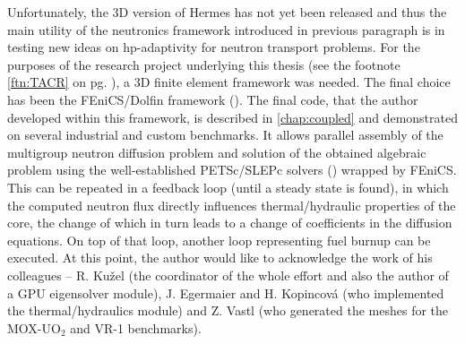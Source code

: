 Unfortunately, the 3D version of Hermes has not yet been released and thus the main utility of the neutronics framework
introduced in previous paragraph is in testing new ideas on hp-adaptivity for neutron transport problems. For the
purposes of the research project underlying this thesis (see the footnote \ref{ftn:TACR} on pg. \pageref{ftn:TACR}), a
3D finite element framework was needed. The final choice has been the FEniCS/Dolfin framework (\cite{dolfin1, dolfin2}).
The final code, that the author developed within this framework, is described in \cref{chap:coupled} and demonstrated on
several industrial and custom benchmarks. It allows parallel assembly of the multigroup neutron diffusion problem and
solution of the obtained algebraic problem using the well-established PETSc/SLEPc solvers (\cite{petsc1, slepc1})
wrapped by FEniCS.
This can be repeated in a feedback loop (until a steady state is found), in which the computed neutron flux directly influences
thermal/hydraulic properties of the core, the change of which in turn leads to a change of coefficients in the diffusion
equations. On top of that loop, another loop representing fuel burnup can be executed. At this point, the author would
like to acknowledge the work of his colleagues -- R. Ku{\v z}el (the coordinator of the whole effort and also the author
of a GPU eigensolver module), J. Egermaier and H. Kopincov{\' a} (who implemented the thermal/hydraulics
module) and Z. Vastl (who generated the meshes for the MOX-UO$_2$ and VR-1 benchmarks).


